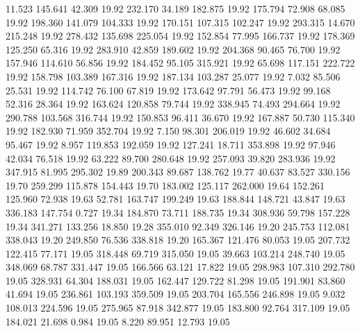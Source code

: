   11.523  145.641   42.309        19.92
 232.170   34.189  182.875        19.92
 175.794   72.908   68.085        19.92
 198.360  141.079  104.333        19.92
 170.151  107.315  102.247        19.92
 293.315   14.670  215.248        19.92
 278.432  135.698  225.054        19.92
 152.854   77.995  166.737        19.92
 178.369  125.250   65.316        19.92
 283.910   42.859  189.602        19.92
 204.368   90.465   76.700        19.92
 157.946  114.610   56.856        19.92
 184.452   95.105  315.921        19.92
  65.698  117.151  222.722        19.92
 158.798  103.389  167.316        19.92
 187.134  103.287   25.077        19.92
   7.032   85.506   25.531        19.92
 114.742   76.100   67.819        19.92
 173.642   97.791   56.473        19.92
  99.168   52.316   28.364        19.92
 163.624  120.858   79.744        19.92
 338.945   74.493  294.664        19.92
 290.788  103.568  316.744        19.92
 150.853   96.411   36.670        19.92
 167.887   50.730  115.340        19.92
 182.930   71.959  352.704        19.92
   7.150   98.301  206.019        19.92
  46.602   34.684   95.467        19.92
   8.957  119.853  192.059        19.92
 127.241   18.711  353.898        19.92
  97.946   42.034   76.518        19.92
  63.222   89.700  280.648        19.92
 257.093   39.820  283.936        19.92
 347.915   81.995  295.302        19.89
 200.343   89.687  138.762        19.77
  40.637   83.527  330.156        19.70
 259.299  115.878  154.443        19.70
 183.002  125.117  262.000        19.64
 152.261  125.960   72.938        19.63
  52.781  163.747  199.249        19.63
 188.844  148.721   43.847        19.63
 336.183  147.754    0.727        19.34
 184.870   73.711  188.735        19.34
 308.936   59.798  157.228        19.34
 341.271  133.256   18.850        19.28
 355.010   92.349  326.146        19.20
 245.753  112.081  338.043        19.20
 249.850   76.536  338.818        19.20
 165.367  121.476   80.053        19.05
 207.732  122.415   77.171        19.05
 318.448   69.719  315.050        19.05
  39.663  103.214  248.740        19.05
 348.069   68.787  331.447        19.05
 166.566   63.121   17.822        19.05
 298.983  107.310  292.780        19.05
 328.931   64.304  188.031        19.05
 162.447  129.722   81.298        19.05
 191.901   83.860   41.694        19.05
 236.861  103.193  359.509        19.05
 203.704  165.556  246.898        19.05
   9.032  108.013  224.596        19.05
 275.965   87.918  342.877        19.05
 183.800   92.764  317.109        19.05
 184.021   21.698    0.984        19.05
   8.220   89.951   12.793        19.05
